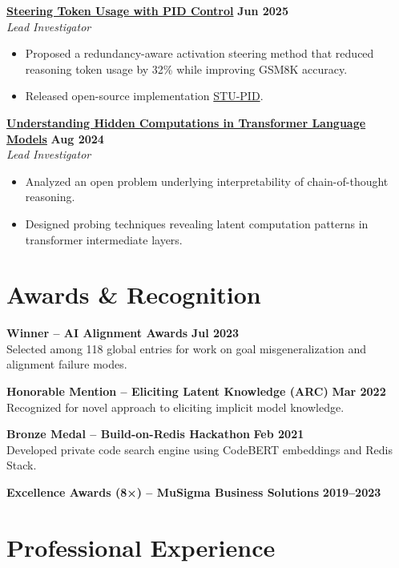 \documentclass[11pt]{article}
\begin{document}
\textbf{\href{https://arxiv.org/abs/2506.18831}{Steering Token Usage with PID Control}} \hfill \textbf{Jun 2025}\\
\textit{Lead Investigator}
\begin{itemize}[leftmargin=*,nosep]
\item Proposed a redundancy-aware activation steering method that reduced reasoning token usage by 32\% while improving GSM8K accuracy.
\item Released open-source implementation \href{https://github.com/rokosbasilisk/STU-PID}{STU-PID}.
\end{itemize}

\textbf{\href{https://arxiv.org/html/2412.04537}{Understanding Hidden Computations in Transformer Language Models}} \hfill \textbf{Aug 2024}\\
\textit{Lead Investigator}
\begin{itemize}[leftmargin=*,nosep]
\item Analyzed an open problem  underlying interpretability of chain-of-thought reasoning.
\item Designed probing techniques revealing latent computation patterns in transformer intermediate layers.
\end{itemize}

\section{Awards \& Recognition}
\textbf{Winner – AI Alignment Awards} \hfill \textbf{Jul 2023}\\
Selected among 118 global entries for work on goal misgeneralization and alignment failure modes.

\textbf{Honorable Mention – Eliciting Latent Knowledge (ARC)} \hfill \textbf{Mar 2022}\\
Recognized for novel approach to eliciting implicit model knowledge.

\textbf{Bronze Medal – Build-on-Redis Hackathon} \hfill \textbf{Feb 2021}\\
Developed private code search engine using CodeBERT embeddings and Redis Stack.

\textbf{Excellence Awards (8×) – MuSigma Business Solutions} \hfill \textbf{2019–2023}

\section{Professional Experience}
\end{document}

